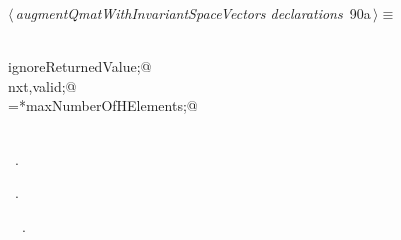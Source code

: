 \documentclass{article}
\begin{document}
\begin{flushleft} \small
\begin{minipage}{\linewidth}\label{scrap161}\raggedright\small
{} $\langle\,${\itshape augmentQmatWithInvariantSpaceVectors declarations}\nobreak\ {\footnotesize {90a}}$\,\rangle\equiv$
\vspace{-1ex}
\begin{list}{}{} \item
\mbox{}\verb@@\\
\mbox{}\verb@int ignoreReturnedValue;@\\
\mbox{}\verb@int nxt,valid;@\\
\mbox{}\verb@originalMaxHElements=*maxNumberOfHElements;@\\
\mbox{}\verb@@\\
\mbox{}\verb@@{\NWsep}
\end{list}
\vspace{-1.5ex}
\footnotesize
\begin{list}{}{\setlength{\itemsep}{-\parsep}\setlength{\itemindent}{-\leftmargin}}
\item \NWtxtMacroDefBy\ .
\item \NWtxtMacroRefIn\ .
\item \NWtxtIdentsUsed\nobreak\  \verb@maxNumberOfHElements@\nobreak\ .
\item{}
\end{list}
\end{minipage}\vspace{4ex}
\end{flushleft}
\end{document}
